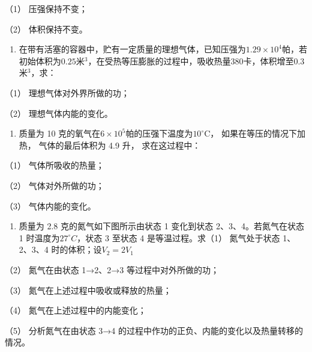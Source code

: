 （1） 压强保持不变；

（2） 体积保持不变。

\begin{enumerate}
\def\labelenumi{\arabic{enumi}.}
\setcounter{enumi}{3}
\tightlist
\item
  在带有活塞的容器中，贮有一定质量的理想气体，已知压强为\(1.29 \times 10^{4}\)帕，若初始体积为\(0.25\)米\(^{3}\)，在受热等压膨胀的过程中，吸收热量\(380\)卡，体积增至\(0.3\)米\(^{3}\)，求：
\end{enumerate}

（1） 理想气体对外界所做的功；

（2） 理想气体内能的变化。

\begin{enumerate}
\def\labelenumi{\arabic{enumi}.}
\setcounter{enumi}{4}
\tightlist
\item
  质量为 10
  克的氧气在\(6 \times 10^{5}\)帕的压强下温度为\(10^{\circ} \mathrm{C}\)，
  如果在等压的情况下加热， 气体的最后体积为 4.9 升， 求在这过程中：
\end{enumerate}

（1） 气体所吸收的热量；

（2） 气体对外所做的功；

（3） 气体内能的变化。

\begin{enumerate}
\def\labelenumi{\arabic{enumi}.}
\setcounter{enumi}{5}
\tightlist
\item
  质量为 2.8 克的氮气如下图所示由状态 1 变化到状态 2、3、4。若氮气在状态
  1 时温度为\(27^{\circ}C\)，状态 3 至状态 4 是等温过程。求（1）
  氮气处于状态 1、2、3、4 时的体积；设\(V_{2}=2V_{1}\)
\end{enumerate}

（2） 氮气在由状态 1→2、2→3 等过程中对外所做的功；

（3） 氮气在上述过程中吸收或释放的热量；

（4） 氮气在上述过程中的内能变化；

（5） 分析氮气在由状态 3→4
的过程中作功的正负、内能的变化以及热量转移的情况。

